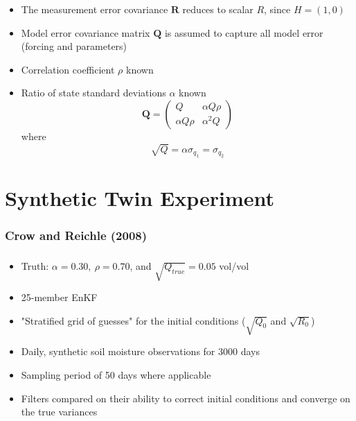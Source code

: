 \documentclass[mathserif]{beamer}
\begin{document}
\begin{frame}
  \frametitle{\insertsection}
  \begin{itemize}
    \item The measurement error covariance $\mathbf{R}$ reduces to scalar $R$, since $H = (1, 0)$
    \item Model error covariance matrix $\mathbf{Q}$ is assumed to capture all model error (forcing and parameters)
    \item Correlation coefficient $\rho$ known
    \item Ratio of state standard deviations $\alpha$ known
      \begin{equation}
        \mathbf{Q}=\begin{pmatrix}
          Q & \alpha Q \rho \\
          \alpha Q \rho & \alpha^2 Q
        \end{pmatrix}
      \end{equation}
      where
      \begin{equation}
        \sqrt{Q} = \alpha\sigma_{q_1} = \sigma_{q_2}
      \end{equation}
  \end{itemize}
\end{frame}

\section{Synthetic Twin Experiment}

\begin{frame}
  \frametitle{Crow and Reichle (2008)}
  \tableofcontents[currentsection]
\end{frame}

\begin{frame}
  \frametitle{\insertsection}
  \begin{itemize}
    \item Truth: $\alpha = 0.30,\ \rho= 0.70$, and $\sqrt{Q_{true}} = 0.05$ vol/vol
    \item 25-member EnKF
    \item "Stratified grid of guesses" for the initial conditions ($\sqrt{Q_0}$ and $\sqrt{R_0}$)
    \item Daily, synthetic soil moisture observations for 3000 days
    \item Sampling period of 50 days where applicable
    \item Filters compared on their ability to correct initial conditions and converge on the true variances
  \end{itemize}
\end{frame}
\end{document}
